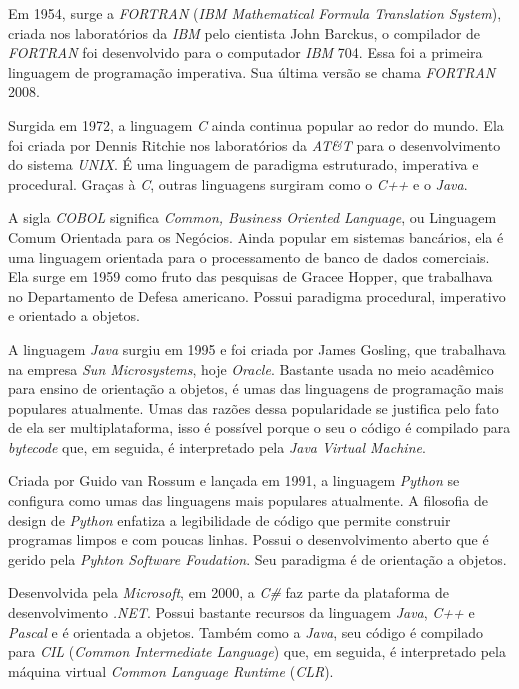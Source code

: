 \documentclass[conference]{IEEEtran}
\begin{document}
Em 1954, surge a \textit{FORTRAN} (\textit{IBM Mathematical Formula Translation System}), criada nos laboratórios da \textit{IBM} pelo cientista John Barckus, o compilador de \textit{FORTRAN} foi desenvolvido para o computador \textit{IBM} 704.  Essa foi a primeira linguagem de programação imperativa. Sua última versão se chama \textit{FORTRAN} 2008.

Surgida em 1972, a linguagem \textit{C} ainda continua popular ao redor do mundo. Ela foi criada por Dennis Ritchie nos laboratórios da \textit{AT&T} para o desenvolvimento do sistema \textit{UNIX}. É uma linguagem de paradigma estruturado, imperativa e procedural. Graças à \textit{C}, outras linguagens surgiram como o \textit{C++} e o \textit{Java}.

A sigla \textit{COBOL} significa \textit{Common, Business Oriented Language}, ou Linguagem Comum Orientada para os Negócios. Ainda popular em sistemas bancários, ela é uma linguagem orientada para o processamento de banco de dados comerciais. Ela surge em 1959 como fruto das pesquisas de Gracee Hopper, que trabalhava no Departamento de Defesa americano. Possui paradigma procedural, imperativo e orientado a objetos.

A linguagem \textit{Java} surgiu em 1995 e foi criada por James Gosling, que trabalhava na empresa \textit{Sun Microsystems}, hoje \textit{Oracle}. Bastante usada no meio acadêmico para ensino de orientação a objetos, é umas das linguagens de programação mais populares atualmente. Umas das razões dessa popularidade se justifica pelo fato de ela ser multiplataforma, isso é possível porque o seu o código é compilado para \textit{bytecode} que, em seguida, é interpretado pela \textit{Java Virtual Machine}.

Criada por Guido van Rossum e lançada em 1991, a linguagem \textit{Python} se configura como umas das linguagens mais populares atualmente. A filosofia de design de \textit{Python} enfatiza a legibilidade de código que permite construir programas limpos e com poucas linhas. Possui o desenvolvimento aberto que é gerido pela \textit{Pyhton Software Foudation}. Seu paradigma é de orientação a objetos.

Desenvolvida pela \textit{Microsoft}, em 2000, a \textit{C\#} faz parte da plataforma de desenvolvimento \textit{.NET}. Possui bastante recursos da linguagem \textit{Java}, \textit{C++} e \textit{Pascal} e é orientada a objetos. Também como a \textit{Java}, seu código é compilado para \textit{CIL} (\textit{Common Intermediate Language}) que, em seguida,  é interpretado pela máquina virtual \textit{Common Language Runtime} (\textit{CLR}).
\end{document}
